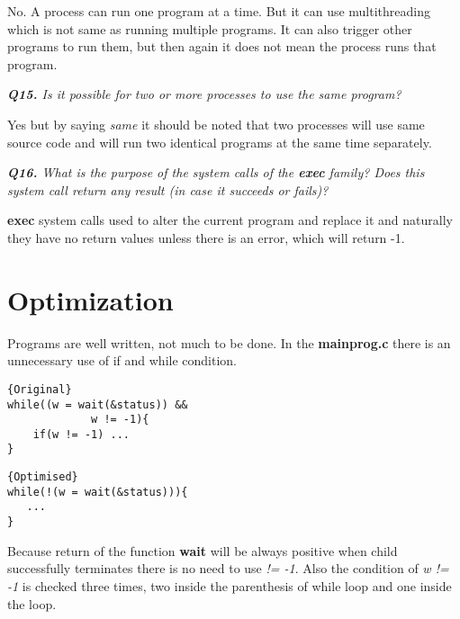 \documentclass[11pt]{article}
\begin{document}
No. A process can run one program at a time. But it can use multithreading which is not same as running multiple programs. It can also trigger other programs to run them, but then again it does not mean the process runs that program.

\vspace{5mm}
\textit{\textbf{Q15.} Is it possible for two or more processes to use the same program?}
\vspace{5mm}

Yes but by saying \textit{same} it should be noted that two processes will use same source code and will run two identical programs at the same time separately.

\vspace{5mm}
\textit{\textbf{Q16.} What is the purpose of the system calls of the \textbf{exec} family? Does this system call return any result (in case it succeeds or fails)?}
\vspace{5mm}

\textbf{exec} system calls used to alter the current program and replace it and naturally they have no return values unless there is an error, which will return -1.
\section*{Optimization}
Programs are well written, not much to be done. In the \textbf{mainprog.c} there is an unnecessary use of if and while condition.

\noindent\begin{minipage}{.45\textwidth}
\begin{lstlisting}[caption=Original,frame=tlrb]{Original}
while((w = wait(&status)) &&
	         w != -1){
	if(w != -1) ...
}
\end{lstlisting}
\end{minipage}\hfill
\begin{minipage}{.50\textwidth}
\begin{lstlisting}[caption=Optimised,frame=tlrb]{Optimised}
while(!(w = wait(&status))){
   ...
}
\end{lstlisting}
\end{minipage}
Because return of the function \textbf{wait} will be always positive when child successfully terminates there is no need to use \textit{!= -1}.  Also the condition of \textit{w != -1} is checked three times, two inside the parenthesis of while loop and one inside the loop.
\end{document}
